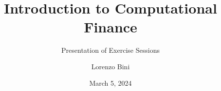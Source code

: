 \documentclass[handout]{beamer}
\title{Introduction to Computational Finance}
\subtitle{Presentation of Exercise Sessions}
\author{Lorenzo Bini}
\institute{University of Geneva}
\date{March 5, 2024}
\begin{document}
\begin{frame}
\titlepage
\end{frame}


\end{document}
